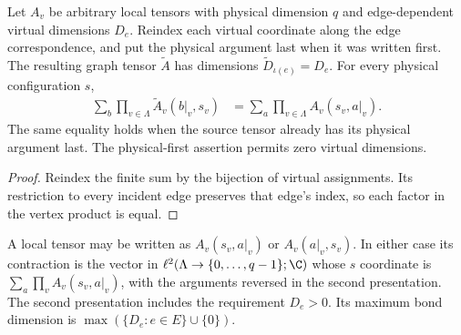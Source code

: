 \begin{lemma}
    \label{thm:peps_square_grid_contraction}
    \leanok
    Let $A_v$ be arbitrary local tensors with physical dimension $q$ and
    edge-dependent virtual dimensions $D_e$. Reindex each virtual coordinate
    along the edge correspondence, and put the physical argument last when it
    was written first. The resulting graph tensor $\widetilde A$ has dimensions
    $\widetilde D_{\iota(e)}=D_e$. For every physical configuration $s$,
    \begin{align}
        \sum_b\prod_{v\in\Lambda}\widetilde A_v(b|_v,s_v)
         & =\sum_a\prod_{v\in\Lambda}A_v(s_v,a|_v).
    \end{align}
    The same equality holds when the source tensor already has its physical
    argument last. The physical-first assertion permits zero virtual dimensions.
\end{lemma}
\begin{proof}
    \leanok
    Reindex the finite sum by the bijection of virtual assignments.
    Its restriction to every incident edge preserves that edge's index, so each
    factor in the vertex product is equal.
\end{proof}


\begin{definition}
    \label{def:peps_square_local_presentations}
    \leanok
    A local tensor may be written as $A_v(s_v,a|_v)$ or $A_v(a|_v,s_v)$.
    In either case its contraction is the vector in
    $\ell^2(\Lambda\to\{0,\ldots,q-1\};\C)$ whose $s$ coordinate is
    $\sum_a\prod_v A_v(s_v,a|_v)$, with the arguments reversed in the second
    presentation. The second presentation includes the requirement $D_e>0$.
    Its maximum bond dimension is $\max(\{D_e:e\in E\}\cup\{0\})$.
\end{definition}
